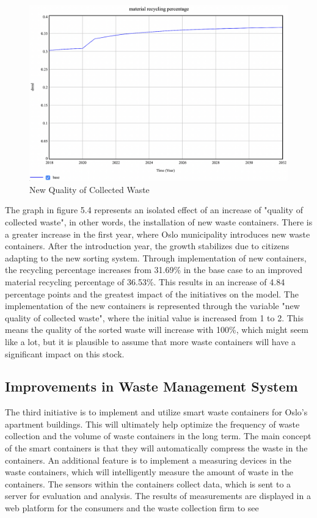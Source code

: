 \begin{figure}[H]
\centering
\includegraphics [scale=0.22,angle=360]{figures/newquality.png}
\caption{New Quality of Collected Waste}
\label{fig:newquality}
\end{figure}

\indent \newline
The graph in figure 5.4 represents an isolated effect of an increase of  "quality of collected waste", in other words, the installation of new waste containers. There is a greater increase in the first year, where Oslo municipality introduces new waste containers. After the introduction year, the growth stabilizes due to citizens adapting to the new sorting system. Through implementation of new containers, the recycling percentage increases from 31.69\% in the base case to an improved material recycling percentage of 36.53\%. This results in an increase of 4.84 percentage points and the greatest impact of the initiatives on the model. The implementation of the new containers is represented through the variable "new quality of collected waste", where the initial value is increased from 1 to 2. This means the quality of the sorted waste will increase with 100\%, which might seem like a lot, but it is plausible to assume that more waste containers will have a significant impact on this stock. 

\subsection{Improvements in Waste Management System}

\indent \newline
The third initiative is to implement and utilize smart waste containers for Oslo's apartment buildings. This will ultimately help optimize the frequency of waste collection and the volume of waste containers in the long term. The main concept of the smart containers is that they will automatically compress the waste in the containers. An additional feature is to implement a measuring devices in the waste containers, which will intelligently measure the amount of waste in the containers. The sensors within the containers collect data, which is sent to a server for evaluation and analysis. The results of measurements are displayed in a web platform for the consumers and the waste collection firm to see \cite{smart}

